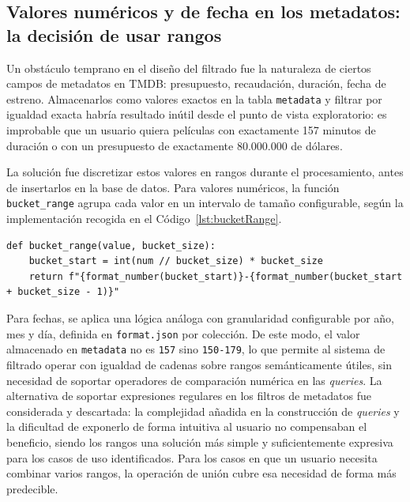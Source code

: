     \subsection*{Valores numéricos y de fecha en los metadatos: la decisión de usar rangos}

Un obstáculo temprano en el diseño del filtrado fue la naturaleza de ciertos campos
de metadatos en TMDB: presupuesto, recaudación, duración, fecha de estreno. Almacenarlos
como valores exactos en la tabla \texttt{metadata} y filtrar por igualdad exacta habría
resultado inútil desde el punto de vista exploratorio: es improbable que un usuario quiera
películas con exactamente 157 minutos de duración o con un presupuesto de exactamente
80.000.000 de dólares.

La solución fue discretizar estos valores en rangos durante el procesamiento, antes de
insertarlos en la base de datos. Para valores numéricos, la función \texttt{bucket\_range}
agrupa cada valor en un intervalo de tamaño configurable, según la implementación
recogida en el Código~\ref{lst:bucketRange}.

\begin{lstlisting}[style=pythonStyle, caption={[Función \texttt{bucket\_range}]Función \texttt{bucket\_range} para discretizar valores numéricos}, label=lst:bucketRange]
def bucket_range(value, bucket_size):
    bucket_start = int(num // bucket_size) * bucket_size
    return f"{format_number(bucket_start)}-{format_number(bucket_start + bucket_size - 1)}"
\end{lstlisting}

Para fechas, se aplica una lógica análoga con granularidad configurable por año, mes y
día, definida en \texttt{format.json} por colección. De este modo, el valor almacenado en
\texttt{metadata} no es \texttt{157} sino \texttt{150-179}, lo que permite al sistema de
filtrado operar con igualdad de cadenas sobre rangos semánticamente útiles, sin necesidad
de soportar operadores de comparación numérica en las \textit{queries}. La alternativa de soportar
expresiones regulares en los filtros de metadatos fue considerada y descartada: la
complejidad añadida en la construcción de \textit{queries} y la dificultad de exponerlo de forma
intuitiva al usuario no compensaban el beneficio, siendo los rangos una solución más
simple y suficientemente expresiva para los casos de uso identificados. Para los casos en
que un usuario necesita combinar varios rangos, la operación de unión cubre esa necesidad
de forma más predecible.

